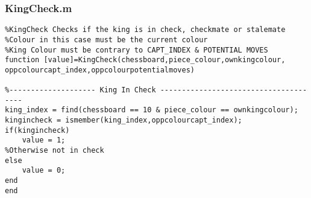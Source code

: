 \documentclass{article}
\begin{document}
\subsubsection{KingCheck.m}
\begin{lstlisting}
%KingCheck Checks if the king is in check, checkmate or stalemate
%Colour in this case must be the current colour
%King Colour must be contrary to CAPT_INDEX & POTENTIAL MOVES
function [value]=KingCheck(chessboard,piece_colour,ownkingcolour, oppcolourcapt_index,oppcolourpotentialmoves)

%-------------------- King In Check --------------------------------------
king_index = find(chessboard == 10 & piece_colour == ownkingcolour);
kingincheck = ismember(king_index,oppcolourcapt_index);
if(kingincheck)
    value = 1;
%Otherwise not in check
else
    value = 0;
end
end

\end{lstlisting}
\end{document}
